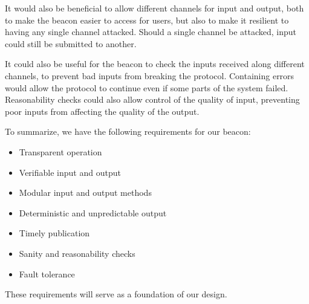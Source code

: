 It would also be beneficial to allow different channels for input and output, both to make the beacon easier to access for users, but also to make it resilient to having any single channel attacked.
Should a single channel be attacked, input could still be submitted to another.

It could also be useful for the beacon to check the inputs received along different channels, to prevent bad inputs from breaking the protocol.
Containing errors would allow the protocol to continue even if some parts of the system failed.
Reasonability checks could also allow control of the quality of input, preventing poor inputs from affecting the quality of the output.

To summarize, we have the following requirements for our beacon:

\begin{itemize}
    \setlength\itemsep{0em}
    \item Transparent operation
    \item Verifiable input and output
    \item Modular input and output methods
    \item Deterministic and unpredictable output
    \item Timely publication
    \item Sanity and reasonability checks
    \item Fault tolerance
\end{itemize}

These requirements will serve as a foundation of our design.

